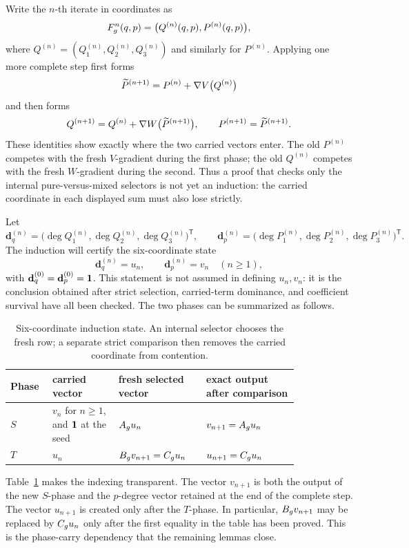 \documentclass[11pt]{article}
\theoremstyle{remark}
\numberwithin{equation}{section}
\begin{document}
Write the \(n\)-th iterate in coordinates as
\[
F_g^n(q,p)=\bigl(Q^{(n)}(q,p),P^{(n)}(q,p)\bigr),
\]
where \(Q^{(n)}=(Q^{(n)}_1,Q^{(n)}_2,Q^{(n)}_3)\) and similarly for
\(P^{(n)}\).  Applying one more complete step first forms
\[
\widetilde P^{(n+1)}
=P^{(n)}+\nabla V\bigl(Q^{(n)}\bigr)
\]
and then forms
\[
Q^{(n+1)}
=Q^{(n)}+\nabla W\bigl(\widetilde P^{(n+1)}\bigr),
\qquad
P^{(n+1)}=\widetilde P^{(n+1)}.
\]
These identities show exactly where the two carried vectors enter.  The old
\(P^{(n)}\) competes with the fresh \(V\)-gradient during the first phase;
the old \(Q^{(n)}\) competes with the fresh \(W\)-gradient during the second.
Thus a proof that checks only the internal pure-versus-mixed selectors is not
yet an induction: the carried coordinate in each displayed sum must also lose
strictly.

Let
\[
\mathbf d_q^{(n)}
=\bigl(\deg Q^{(n)}_1,\deg Q^{(n)}_2,\deg Q^{(n)}_3\bigr)^{\mathsf T},
\qquad
\mathbf d_p^{(n)}
=\bigl(\deg P^{(n)}_1,\deg P^{(n)}_2,\deg P^{(n)}_3\bigr)^{\mathsf T}.
\]
The induction will certify the six-coordinate state
\[
\mathbf d_q^{(n)}=u_n,
\qquad
\mathbf d_p^{(n)}=v_n\quad(n\geq1),
\]
with \(\mathbf d_q^{(0)}=\mathbf d_p^{(0)}=\mathbf{1}\).  This statement is not
assumed in defining \(u_n,v_n\): it is the conclusion obtained after strict
selection, carried-term dominance, and coefficient survival have all been
checked.  The two phases can be summarized as follows.

\begin{table}[t]
\centering
\small
\begin{tabular}{p{0.09\linewidth}p{0.20\linewidth}p{0.25\linewidth}p{0.29\linewidth}}
\toprule
Phase & carried vector & fresh selected vector & exact output after comparison \\
\midrule
\(S\) & \(v_n\) for \(n\geq1\), and \(\mathbf{1}\) at the seed & \(A_g u_n\) & \(v_{n+1}=A_g u_n\) \\
\(T\) & \(u_n\) & \(B_g v_{n+1}=C_g u_n\) & \(u_{n+1}=C_g u_n\) \\
\bottomrule
\end{tabular}
\caption{Six-coordinate induction state.  An internal selector chooses the fresh row; a separate strict comparison then removes the carried coordinate from contention.}
\label{tab:six-state}
\end{table}

Table~\ref{tab:six-state} makes the indexing transparent.  The vector
\(v_{n+1}\) is both the output of the new \(S\)-phase and the \(p\)-degree
vector retained at the end of the complete step.  The vector \(u_{n+1}\) is
created only after the \(T\)-phase.  In particular, \(B_g v_{n+1}\) may be
replaced by \(C_g u_n\) only after the first equality in the table has been
proved.  This is the phase-carry dependency that the remaining lemmas close.
\end{document}
